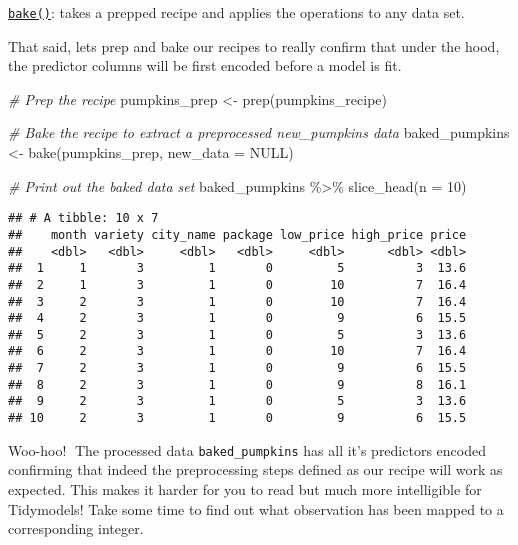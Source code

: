 \documentclass[
]{article}
\newenvironment{Shaded}{\begin{snugshade}}{\end{snugshade}}
\newcommand{\AttributeTok}[1]{\textcolor[rgb]{0.77,0.63,0.00}{#1}}
\newcommand{\CommentTok}[1]{\textcolor[rgb]{0.56,0.35,0.01}{\textit{#1}}}
\newcommand{\ConstantTok}[1]{\textcolor[rgb]{0.00,0.00,0.00}{#1}}
\newcommand{\DecValTok}[1]{\textcolor[rgb]{0.00,0.00,0.81}{#1}}
\newcommand{\FunctionTok}[1]{\textcolor[rgb]{0.00,0.00,0.00}{#1}}
\newcommand{\NormalTok}[1]{#1}
\newcommand{\OtherTok}[1]{\textcolor[rgb]{0.56,0.35,0.01}{#1}}
\newcommand{\SpecialCharTok}[1]{\textcolor[rgb]{0.00,0.00,0.00}{#1}}
\begin{document}
\href{https://recipes.tidymodels.org/reference/bake.html}{\texttt{bake()}}:
takes a prepped recipe and applies the operations to any data set.

That said, lets prep and bake our recipes to really confirm that under
the hood, the predictor columns will be first encoded before a model is
fit.

\begin{Shaded}
\begin{Highlighting}[]
\CommentTok{\# Prep the recipe}
\NormalTok{pumpkins\_prep }\OtherTok{\textless{}{-}} \FunctionTok{prep}\NormalTok{(pumpkins\_recipe)}

\CommentTok{\# Bake the recipe to extract a preprocessed new\_pumpkins data}
\NormalTok{baked\_pumpkins }\OtherTok{\textless{}{-}} \FunctionTok{bake}\NormalTok{(pumpkins\_prep, }\AttributeTok{new\_data =} \ConstantTok{NULL}\NormalTok{)}

\CommentTok{\# Print out the baked data set}
\NormalTok{baked\_pumpkins }\SpecialCharTok{\%\textgreater{}\%} 
  \FunctionTok{slice\_head}\NormalTok{(}\AttributeTok{n =} \DecValTok{10}\NormalTok{)}
\end{Highlighting}
\end{Shaded}

\begin{verbatim}
## # A tibble: 10 x 7
##    month variety city_name package low_price high_price price
##    <dbl>   <dbl>     <dbl>   <dbl>     <dbl>      <dbl> <dbl>
##  1     1       3         1       0         5          3  13.6
##  2     1       3         1       0        10          7  16.4
##  3     2       3         1       0        10          7  16.4
##  4     2       3         1       0         9          6  15.5
##  5     2       3         1       0         5          3  13.6
##  6     2       3         1       0        10          7  16.4
##  7     2       3         1       0         9          6  15.5
##  8     2       3         1       0         9          8  16.1
##  9     2       3         1       0         5          3  13.6
## 10     2       3         1       0         9          6  15.5
\end{verbatim}

Woo-hoo!🥳 The processed data \texttt{baked\_pumpkins} has all it's
predictors encoded confirming that indeed the preprocessing steps
defined as our recipe will work as expected. This makes it harder for
you to read but much more intelligible for Tidymodels! Take some time to
find out what observation has been mapped to a corresponding integer.
\end{document}
